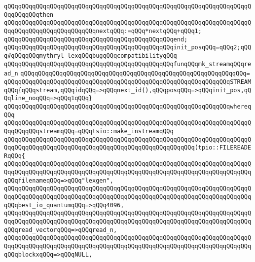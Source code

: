 \verb|qQQqqQQqqQQqqQQqqQQqqQQqqQQqqQQqqQQqqQQqqQQqqQQqqQQqqQQqqQQqqQQqqQQqqQQqqQQqqQQqthen|\newline
\verb|qQQqqQQqqQQqqQQqqQQqqQQqqQQqqQQqqQQqqQQqqQQqqQQqqQQqqQQqqQQqqQQqqQQqqQQqqQQqqQQqqQQqqQQqqQQqqQQqnextqQQq:=qQQq*nextqQQq+qQQq1;|\newline
\verb|qQQqqQQqqQQqqQQqqQQqqQQqqQQqqQQqqQQqqQQqqQQqqQQqend;|\newline
\newline
\verb|qQQqqQQqqQQqqQQqqQQqqQQqqQQqqQQqqQQqqQQqqQQqqQQqinit_posqQQq=qQQq2;qQQq#qQQqqQQqmythryl-lexqQQqbugqQQqcompatibilityqQQq|\newline
\newline
\verb|qQQqqQQqqQQqqQQqqQQqqQQqqQQqqQQqqQQqqQQqqQQqqQQqfunqQQqmk_streamqQQqread_n|\newline
\verb|qQQqqQQqqQQqqQQqqQQqqQQqqQQqqQQqqQQqqQQqqQQqqQQqqQQqqQQqqQQqqQQq=|\newline
\verb|qQQqqQQqqQQqqQQqqQQqqQQqqQQqqQQqqQQqqQQqqQQqqQQqqQQqqQQqqQQqqQQqSTREAMqQQq{qQQqstream,qQQqidqQQq=>qQQqnext_id(),qQQqposqQQq=>qQQqinit_pos,qQQqline_noqQQq=>qQQq1qQQq}|\newline
\verb|qQQqqQQqqQQqqQQqqQQqqQQqqQQqqQQqqQQqqQQqqQQqqQQqqQQqqQQqqQQqqQQqwhereqQQq|\newline
\newline
\verb|qQQqqQQqqQQqqQQqqQQqqQQqqQQqqQQqqQQqqQQqqQQqqQQqqQQqqQQqqQQqqQQqqQQqqQQqqQQqqQQqstreamqQQq=qQQqtsio::make_instreamqQQq|\newline
\verb|qQQqqQQqqQQqqQQqqQQqqQQqqQQqqQQqqQQqqQQqqQQqqQQqqQQqqQQqqQQqqQQqqQQqqQQqqQQqqQQqqQQqqQQqqQQqqQQqqQQqqQQqqQQqqQQqqQQqqQQqqQQq(tpio::FILEREADERqQQq{|\newline
\verb|qQQqqQQqqQQqqQQqqQQqqQQqqQQqqQQqqQQqqQQqqQQqqQQqqQQqqQQqqQQqqQQqqQQqqQQqqQQqqQQqqQQqqQQqqQQqqQQqqQQqqQQqqQQqqQQqqQQqqQQqqQQqqQQqqQQqqQQqqQQqqQQqfilenameqQQq=>qQQq"lexgen",|\newline
\verb|qQQqqQQqqQQqqQQqqQQqqQQqqQQqqQQqqQQqqQQqqQQqqQQqqQQqqQQqqQQqqQQqqQQqqQQqqQQqqQQqqQQqqQQqqQQqqQQqqQQqqQQqqQQqqQQqqQQqqQQqqQQqqQQqqQQqqQQqqQQqqQQqbest_io_quantumqQQq=>qQQq4096,|\newline
\verb|qQQqqQQqqQQqqQQqqQQqqQQqqQQqqQQqqQQqqQQqqQQqqQQqqQQqqQQqqQQqqQQqqQQqqQQqqQQqqQQqqQQqqQQqqQQqqQQqqQQqqQQqqQQqqQQqqQQqqQQqqQQqqQQqqQQqqQQqqQQqqQQqread_vectorqQQq=>qQQqread_n,|\newline
\verb|qQQqqQQqqQQqqQQqqQQqqQQqqQQqqQQqqQQqqQQqqQQqqQQqqQQqqQQqqQQqqQQqqQQqqQQqqQQqqQQqqQQqqQQqqQQqqQQqqQQqqQQqqQQqqQQqqQQqqQQqqQQqqQQqqQQqqQQqqQQqqQQqblockxqQQq=>qQQqNULL,|\newline
